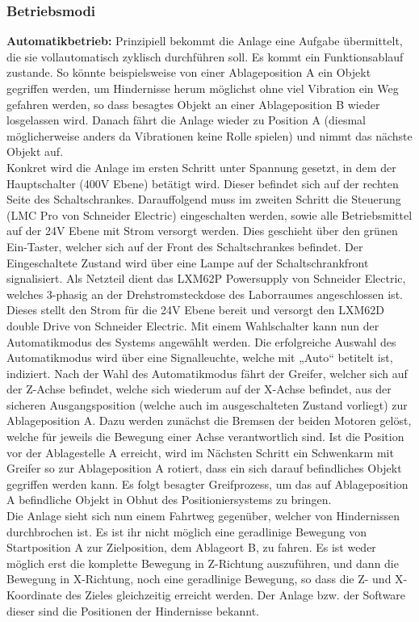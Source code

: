 \documentclass[../Bachelorarbeit.tex]{subfiles}
\begin{document}
\subsubsection{Betriebsmodi}
\textbf{Automatikbetrieb:} Prinzipiell bekommt die Anlage eine Aufgabe übermittelt, die sie vollautomatisch zyklisch durchführen soll. Es kommt ein Funktionsablauf zustande. So könnte beispielsweise von einer Ablageposition A ein Objekt gegriffen werden, um Hindernisse herum möglichst ohne viel Vibration ein Weg gefahren werden, so dass besagtes Objekt an einer Ablageposition B wieder losgelassen wird. Danach fährt die Anlage wieder zu Position A (diesmal möglicherweise anders da Vibrationen keine Rolle spielen) und nimmt das nächste Objekt auf.\\
Konkret wird die Anlage im ersten Schritt unter Spannung gesetzt, in dem der Hauptschalter (400V Ebene) betätigt wird. Dieser befindet sich auf der rechten Seite des Schaltschrankes. Darauffolgend muss im zweiten Schritt die Steuerung (LMC Pro von Schneider Electric) eingeschalten werden, sowie alle Betriebsmittel auf der 24V Ebene mit Strom versorgt werden. Dies geschieht über den grünen Ein-Taster, welcher sich auf der Front des Schaltschrankes befindet. Der Eingeschaltete Zustand wird über eine Lampe auf der Schaltschrankfront signalisiert. Als Netzteil dient das LXM62P Powersupply von Schneider Electric, welches 3-phasig an der Drehstromsteckdose des Laborraumes angeschlossen ist. Dieses stellt den Strom für die 24V Ebene bereit und versorgt den LXM62D double Drive von Schneider Electric. Mit einem Wahlschalter kann nun der Automatikmodus des Systems angewählt werden. Die erfolgreiche Auswahl des Automatikmodus wird über eine Signalleuchte, welche mit „Auto“ betitelt ist, indiziert. 
Nach der Wahl des Automatikmodus fährt der Greifer, welcher sich auf der Z-Achse befindet, welche sich wiederum auf der X-Achse befindet, aus der sicheren Ausgangsposition (welche auch im ausgeschalteten Zustand vorliegt) zur Ablageposition A. Dazu werden zunächst die Bremsen der beiden Motoren gelöst, welche für jeweils die Bewegung einer Achse verantwortlich sind. Ist die Position vor der Ablagestelle A erreicht, wird im Nächsten Schritt ein Schwenkarm mit Greifer so zur Ablageposition A rotiert, dass ein sich darauf befindliches Objekt gegriffen werden kann. Es folgt besagter Greifprozess, um das auf Ablageposition A befindliche Objekt in Obhut des Positioniersystems zu bringen.\\
Die Anlage sieht sich nun einem Fahrtweg gegenüber, welcher von Hindernissen durchbrochen ist. Es ist ihr nicht möglich eine geradlinige Bewegung von Startposition A zur Zielposition, dem Ablageort B, zu fahren. Es ist weder möglich erst die komplette Bewegung in Z-Richtung auszuführen, und dann die Bewegung in X-Richtung, noch eine geradlinige Bewegung, so dass die Z- und X-Koordinate des Zieles gleichzeitig erreicht werden. Der Anlage bzw. der Software dieser sind die Positionen der Hindernisse bekannt.\\
\end{document}
